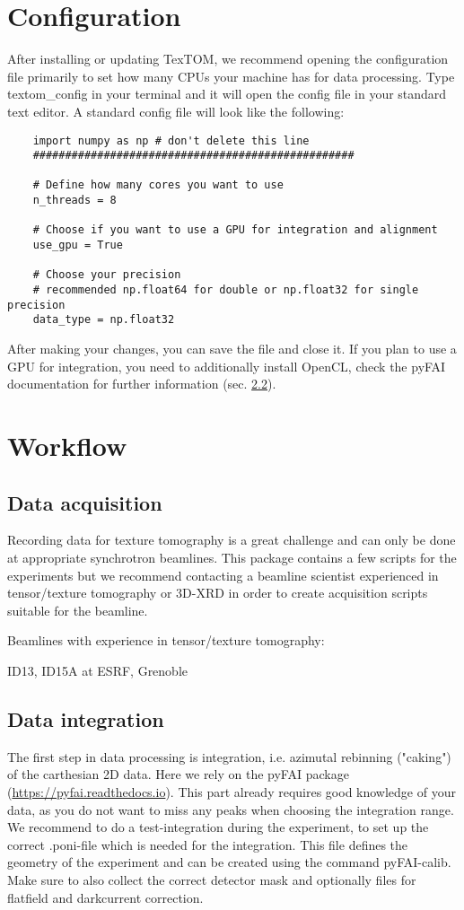 \section{Configuration}
After installing or updating TexTOM, we recommend opening the configuration file primarily to set how many CPUs your machine has
for data processing. Type textom\_config in your terminal and it will open the config file in your standard
text editor. A standard config file will look like the following:
\begin{verbatim}
    import numpy as np # don't delete this line
    ##################################################
    
    # Define how many cores you want to use 
    n_threads = 8 
    
    # Choose if you want to use a GPU for integration and alignment
    use_gpu = True
    
    # Choose your precision
    # recommended np.float64 for double or np.float32 for single precision
    data_type = np.float32
\end{verbatim}
After making your changes, you can save the file and close it.
If you plan to use a GPU for integration, you need to additionally install OpenCL, check the pyFAI documentation for
further information (sec. \ref{sec:integration}).

\section{Workflow}

\subsection{Data acquisition}
Recording data for texture tomography is a great challenge and can only be done at appropriate synchrotron beamlines.
This package contains a few scripts for the experiments but we recommend contacting a beamline scientist experienced in tensor/texture tomography or 
3D-XRD in order to create acquisition scripts suitable for the beamline.

Beamlines with experience in tensor/texture tomography:

ID13, ID15A at ESRF, Grenoble

\subsection{Data integration}\label{sec:integration}
The first step in data processing is integration, i.e. azimutal rebinning ("caking") of the carthesian 2D data.
Here we rely on the pyFAI package (\url{https://pyfai.readthedocs.io}).
This part already requires good knowledge of your data, as you do not want to miss any peaks when choosing the
integration range. We recommend to do a test-integration during the experiment, to set up the correct
.poni-file which is needed for the integration. This file defines the geometry of the experiment and can be
created using the command pyFAI-calib. Make sure to also collect the correct detector mask and optionally files
for flatfield and darkcurrent correction.

